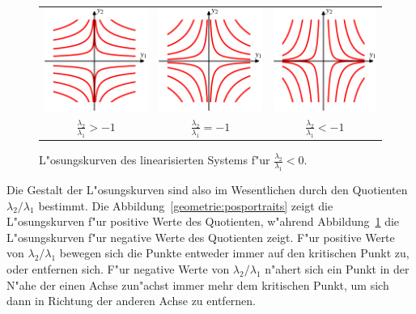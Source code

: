 \begin{figure}
\centering
\begin{tabular}{ccc}
\includegraphics{chapters/images/geometrie-5.pdf}&%
\includegraphics{chapters/images/geometrie-6.pdf}&%
\includegraphics{chapters/images/geometrie-7.pdf}\\
$\displaystyle \frac{\lambda_2}{\lambda_1}>-1$&%
$\displaystyle \frac{\lambda_2}{\lambda_1}=-1$&%
$\displaystyle \frac{\lambda_2}{\lambda_1}<-1$
\end{tabular}
\caption{L"osungskurven des linearisierten Systems f"ur
$\frac{\lambda_2}{\lambda_1}<0$.
\label{geometrie:negportraits}}
\end{figure}
Die Gestalt der L"osungskurven sind also im Wesentlichen durch den
Quotienten $\lambda_2/\lambda_1$ bestimmt.
Die Abbildung~\ref{geometrie:posportraits} zeigt die L"osungskurven
f"ur positive Werte des Quotienten, w"ahrend
Abbildung~\ref{geometrie:negportraits} die L"osungskurven f"ur
negative Werte des Quotienten zeigt.
F"ur positive Werte von $\lambda_2/\lambda_1$ bewegen sich die 
Punkte entweder immer auf den kritischen Punkt zu, oder entfernen
sich.
F"ur negative Werte von $\lambda_2/\lambda_1$ n"ahert sich ein
Punkt in der N"ahe der einen Achse zun"achst immer mehr dem kritischen
Punkt, um sich dann in Richtung der anderen Achse zu entfernen.

